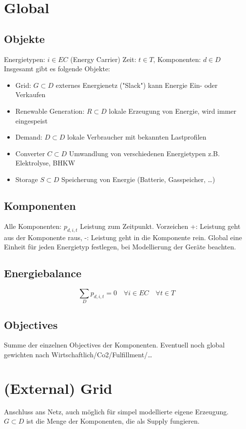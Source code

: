 \documentclass[]{article}
\begin{document}
\section{Global}
\subsection{Objekte}
Energietypen: $i \in EC$ (Energy Carrier) Zeit: $t \in T$, Komponenten: $d \in D$
Insgesamt gibt es folgende Objekte:
\begin{itemize}
    \item Grid: $G \subset D$ externes Energienetz ("Slack") kann Energie Ein- oder Verkaufen
    \item Renewable Generation: $R \subset D$ lokale Erzeugung von Energie, wird immer eingespeist
    \item Demand: $D \subset D$ lokale Verbraucher mit bekannten Lastprofilen
    \item Converter $C \subset D$ Umwandlung von verschiedenen Energietypen z.B. Elektrolyse, BHKW
    \item Storage $S \subset D$ Speicherung von Energie (Batterie, Gasspeicher, \ldots)
\end{itemize}
\subsection{Komponenten}
Alle Komponenten: $p_{d,i,t}$ Leistung zum Zeitpunkt.
Vorzeichen +: Leistung geht aus der Komponente raus, -: Leistung geht in die Komponente rein.
Global eine Einheit für jeden Energietyp festlegen, bei Modellierung der Geräte beachten.
\subsection{Energiebalance}
\begin{equation}
    \sum_{D} p_{d,i,t} = 0 \quad \forall i \in EC \quad \forall t \in T
\end{equation}
\subsection{Objectives}
Summe der einzelnen Objectives der Komponenten. Eventuell noch global gewichten nach Wirtschaftlich/Co2/Fulfillment/\ldots
\section{(External) Grid}
Anschluss ans Netz, auch möglich für simpel modellierte eigene Erzeugung.
$G \subset D$ ist die Menge der Komponenten, die als Supply fungieren.
\end{document}

